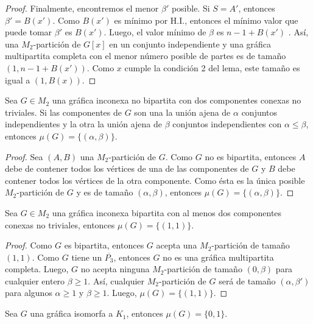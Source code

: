 \begin{proof}
Finalmente, encontremos el menor $\beta'$ posible. Si $S=A'$, entonces $\beta'=B(x')$. Como $B(x')$ es mínimo por H.I., entonces el mínimo valor que puede tomar $\beta'$ es $B(x')$. Luego, el valor mínimo de $\beta$ es $n-1+B(x')$ . Así, una $M_2$-partición de $G[x]$ en un conjunto independiente y una gráfica multipartita completa con el menor número posible de partes es de tamaño $(1,n-1+B(x'))$. Como $x$ cumple la condición 2 del lema, este tamaño es igual a $(1,B(x))$. 

\end{proof}

\begin{lemma}\label{lema_parejas_04}
Sea $G\in M_2$ una gráfica inconexa no bipartita con dos componentes conexas no triviales. Si las componentes de $G$ son una la unión ajena de $\alpha$ conjuntos independientes y la otra la unión ajena de $\beta$ conjuntos independientes con $\alpha \le \beta$, entonces $\mu(G)=\{(\alpha,\beta)\}$.
\end{lemma}

\begin{proof}
Sea $(A,B)$ una $M_2$-partición de $G$. Como $G$ no es bipartita, entonces $A$ debe de contener todos los vértices de una de las componentes de $G$ y $B$ debe contener todos los vértices de la otra componente. Como ésta es la única posible $M_2$-partición de $G$ y es de tamaño $(\alpha, \beta)$, entonces $\mu(G)=\{(\alpha,\beta)\}$.
\end{proof}

\begin{lemma}\label{lema_parejas_05}
Sea $G\in M_2$ una gráfica inconexa bipartita con al menos dos componentes conexas no triviales, entonces $\mu(G)=\{(1,1)\}$.
\end{lemma}

\begin{proof}
Como $G$ es bipartita, entonces $G$ acepta una $M_2$-partición de tamaño $(1,1)$. Como $G$ tiene un $\overline{P_3}$, entonces $G$ no es una gráfica multipartita completa. Luego, $G$ no acepta ninguna $M_2$-partición de tamaño $(0,\beta)$ para cualquier entero $\beta \geq 1$. Así, cualquier $M_2$-partición de $G$ será de tamaño $(\alpha,\beta')$ para algunos $\alpha \geq 1$ y $\beta \geq 1$. Luego, $\mu(G)=\{(1,1)\}$.
\end{proof}

\begin{lemma}\label{lema_parejas_06}
Sea $G$ una gráfica isomorfa a $K_1$, entonces $\mu(G)=\{0,1\}$.
\end{lemma}


